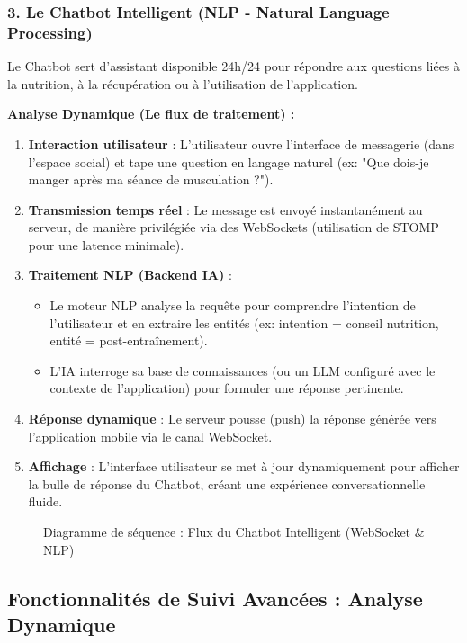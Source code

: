 \subsubsection{3. Le Chatbot Intelligent (NLP - Natural Language Processing)}
Le Chatbot sert d'assistant disponible 24h/24 pour répondre aux questions liées à la nutrition, à la récupération ou à l'utilisation de l'application.

\textbf{Analyse Dynamique (Le flux de traitement) :}
\begin{enumerate}
    \item \textbf{Interaction utilisateur} : L'utilisateur ouvre l'interface de messagerie (dans l'espace social) et tape une question en langage naturel (ex: "Que dois-je manger après ma séance de musculation ?").
    \item \textbf{Transmission temps réel} : Le message est envoyé instantanément au serveur, de manière privilégiée via des WebSockets (utilisation de STOMP pour une latence minimale).
    \item \textbf{Traitement NLP (Backend IA)} :
    \begin{itemize}
        \item Le moteur NLP analyse la requête pour comprendre l'intention de l'utilisateur et en extraire les entités (ex: intention = conseil nutrition, entité = post-entraînement).
        \item L'IA interroge sa base de connaissances (ou un LLM configuré avec le contexte de l'application) pour formuler une réponse pertinente.
    \end{itemize}
    \item \textbf{Réponse dynamique} : Le serveur pousse (push) la réponse générée vers l'application mobile via le canal WebSocket.
    \item \textbf{Affichage} : L'interface utilisateur se met à jour dynamiquement pour afficher la bulle de réponse du Chatbot, créant une expérience conversationnelle fluide.
\end{enumerate}

\begin{figure}[H]
    \centering
\caption{Diagramme de séquence : Flux du Chatbot Intelligent (WebSocket \& NLP)}
\end{figure}

\subsection{Fonctionnalités de Suivi Avancées : Analyse Dynamique}

